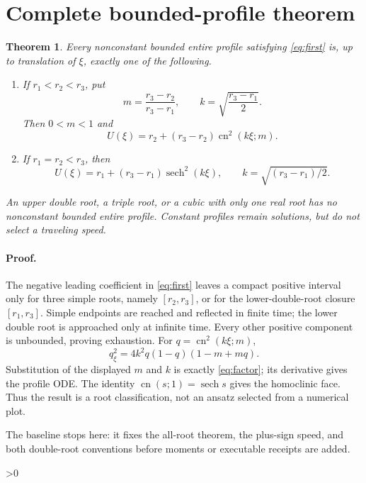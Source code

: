 \documentclass[10pt]{article}
\newtheorem{theorem}{Theorem}
\newcommand{\cn}{\operatorname{cn}}
\newcommand{\sech}{\operatorname{sech}}
\begin{document}
\section{Complete bounded-profile theorem}
\begin{theorem}\label{thm:atlas}
Every nonconstant bounded entire profile satisfying \eqref{eq:first} is,
up to translation of $\xi$, exactly one of the following.
\begin{enumerate}
\item If $r_1<r_2<r_3$, put
\[
 m=\frac{r_3-r_2}{r_3-r_1},\qquad
 k=\sqrt{\frac{r_3-r_1}{2}}.
\]
Then $0<m<1$ and
\begin{equation}
 U(\xi)=r_2+(r_3-r_2)\cn^2(k\xi;m).       \label{eq:cnoid}
\end{equation}
\item If $r_1=r_2<r_3$, then
\begin{equation}
 U(\xi)=r_1+(r_3-r_1)\sech^2(k\xi),
 \qquad k=\sqrt{(r_3-r_1)/2}.             \label{eq:soliton}
\end{equation}
\end{enumerate}
An upper double root, a triple root, or a cubic with only one real root has
no nonconstant bounded entire profile.  Constant profiles remain solutions,
but do not select a traveling speed.
\end{theorem}

\paragraph{Proof.}
The negative leading coefficient in \eqref{eq:first} leaves a compact
positive interval only for three simple roots, namely $[r_2,r_3]$, or for
the lower-double-root closure $[r_1,r_3]$.  Simple endpoints are reached and
reflected in finite time; the lower double root is approached only at
infinite time.  Every other positive component is unbounded, proving
exhaustion.  For $q=\cn^2(k\xi;m)$,
\[
 q_\xi^2=4k^2q(1-q)(1-m+mq).
\]
Substitution of the displayed $m$ and $k$ is exactly \eqref{eq:factor}; its
derivative gives the profile ODE.  The identity $\cn(s;1)=\sech s$ gives the
homoclinic face.  Thus the result is a root classification, not an ansatz
selected from a numerical plot.

\ifnum{}
The baseline stops here: it fixes the all-root theorem, the plus-sign speed,
and both double-root conventions before moments or executable receipts are
added.
\fi

\ifnum\CRevisionRound>0
\end{document}
